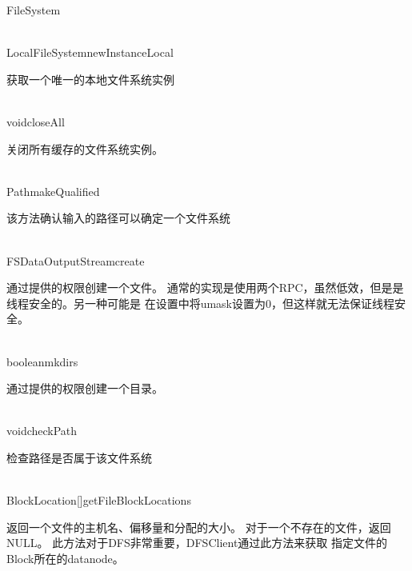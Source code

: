\begin{XeClass}{FileSystem}
  \begin{XeMethod}{\XePublic\\ }{LocalFileSystem}{newInstanceLocal}
       
 获取一个唯一的本地文件系统实例

  \end{XeMethod}

  \begin{XeMethod}{\XePublic\\ }{void}{closeAll}
       
 关闭所有缓存的文件系统实例。

  \end{XeMethod}

  \begin{XeMethod}{\XePublic\\ }{Path}{makeQualified}
       
 该方法确认输入的路径可以确定一个文件系统

  \end{XeMethod}

  \begin{XeMethod}{\XePublic\\ }{FSDataOutputStream}{create}
       
 通过提供的权限创建一个文件。
 通常的实现是使用两个RPC，虽然低效，但是是线程安全的。另一种可能是
 在设置中将umask设置为0，但这样就无法保证线程安全。

  \end{XeMethod}

  \begin{XeMethod}{\XePublic\\ }{boolean}{mkdirs}
       
 通过提供的权限创建一个目录。

  \end{XeMethod}

  \begin{XeMethod}{\XeProtected\\ }{void}{checkPath}
       
 检查路径是否属于该文件系统

  \end{XeMethod}

  \begin{XeMethod}{\XePublic\\ }{BlockLocation[]}{getFileBlockLocations}
       
 返回一个文件的主机名、偏移量和分配的大小。
 对于一个不存在的文件，返回NULL。
 此方法对于DFS非常重要，DFSClient通过此方法来获取
 指定文件的Block所在的datanode。


\end{XeMethod}
\end{XeClass}
